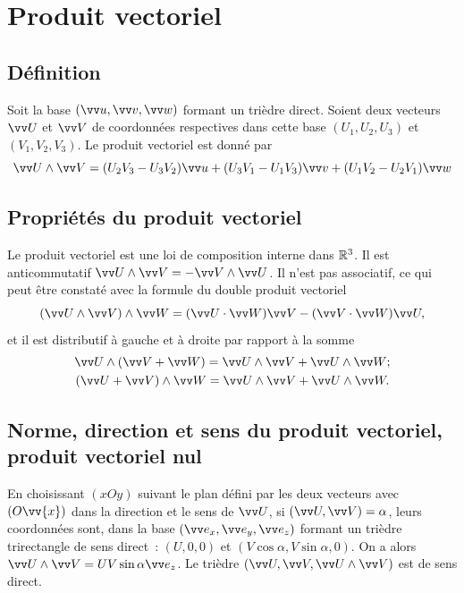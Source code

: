 \section{Produit vectoriel}
\label{chap1-sec:produitvectoriel}

\subsection{Définition}
\label{chap1-subsec:defprodvec}

Soit la base $(\vu,\vvv,\vw)$ formant un trièdre direct. Soient deux vecteurs $\vU$ et $\vV$ de coordonnées respectives dans cette base $(U_1,U_2,U_3)$ et $(V_1,V_2,V_3)$. Le produit vectoriel est donné par
\begin{equation}
  \vU \wedge \vV = (U_2V_3-U_3V_2) \vu + (U_3V_1-U_1V_3) \vvv + (U_1V_2-U_2V_1) \vw
\end{equation}

\subsection{Propriétés du produit vectoriel}
\label{chap1-subsec:propprodvec}

Le produit vectoriel est une loi de composition interne dans $\mathbb{R}^3$. Il est anticommutatif $\vU\wedge\vV=-\vV\wedge\vU$. Il n'est pas associatif, ce qui peut être constaté avec la formule du double produit vectoriel
\begin{equation}
  \label{eq:doubleproduitvectoriel}
  (\vU\wedge\vV)\wedge\vW=(\vU\cdot\vW)\vV-(\vV\cdot\vW)\vU,
\end{equation}
et il est distributif à gauche et à droite par rapport à la somme
\begin{gather}
  \vU\wedge(\vV+\vW)= \vU\wedge\vV + \vU\wedge\vW;\\
  (\vU+\vV)\wedge\vW = \vU\wedge\vV + \vU\wedge\vW.
\end{gather}

\subsection{Norme, direction et sens du produit vectoriel, produit vectoriel nul}
\label{chap1-sec:normedirectionetsensproduitvectoriel}

En choisissant $(xOy)$ suivant le plan défini par les deux vecteurs avec $(O\vv{x})$ dans la direction et le sens de $\vU$, si $(\vU,\vV)=\alpha$, leurs coordonnées sont, dans la base $(\ex,\ey,\ez)$ formant un trièdre trirectangle de sens direct~: $(U,0,0)$ et $(V\cos\alpha,V\sin\alpha,0)$. On a alors $\vU\wedge\vV = UV\sin\alpha\ez$. Le trièdre $(\vU,\vV,\vU\wedge\vV)$ est de sens direct.

